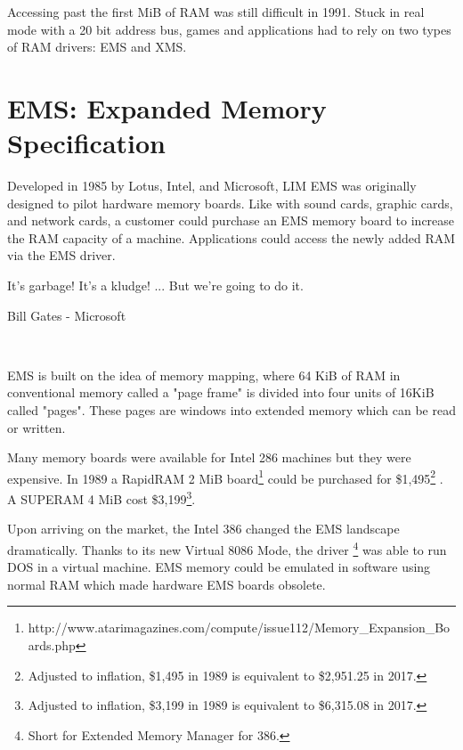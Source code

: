 \label{ems_vs_xms}
Accessing past the first MiB of RAM was still difficult in 1991. Stuck in real mode with a 20 bit address bus, games and applications had to rely on two types of RAM drivers: EMS and XMS.\\
\par

\section{EMS: Expanded Memory Specification}
Developed in 1985 by Lotus, Intel, and Microsoft, LIM EMS was originally designed to pilot hardware memory boards. Like with sound cards, graphic cards, and network cards, a customer could purchase an EMS memory board to increase the RAM capacity of a machine. Applications could access the newly added RAM via the EMS driver.\\
\par
\begin{fancyquotes}
It's garbage! It's a kludge! ... But we're going to do it.\\
\par
Bill Gates - Microsoft
\end{fancyquotes}\\
\par
 EMS is built on the idea of memory mapping, where 64 KiB of RAM in conventional memory called a "page frame" is divided into four units of 16KiB called "pages". These pages are windows into extended memory which can be read or written.\\
\par


Many memory boards were available for Intel 286 machines but they were expensive. In 1989 a RapidRAM 2 MiB board\footnote{http://www.atarimagazines.com/compute/issue112/Memory\_Expansion\_Boards.php} could be purchased for \$1,495\footnote{Adjusted to inflation, \$1,495 in 1989 is equivalent to \$2,951.25 in 2017.} . A SUPERAM 4 MiB cost \$3,199\footnote{Adjusted to inflation, \$3,199 in 1989 is equivalent to \$6,315.08 in 2017.}.\\
\par
Upon arriving on the market, the Intel 386 changed the EMS landscape dramatically. Thanks to its new Virtual 8086 Mode, the driver \footnote{Short for Extended Memory Manager for 386.} was able to run DOS in a virtual machine. EMS memory could be emulated in software using normal RAM which made hardware EMS boards  obsolete.\\



